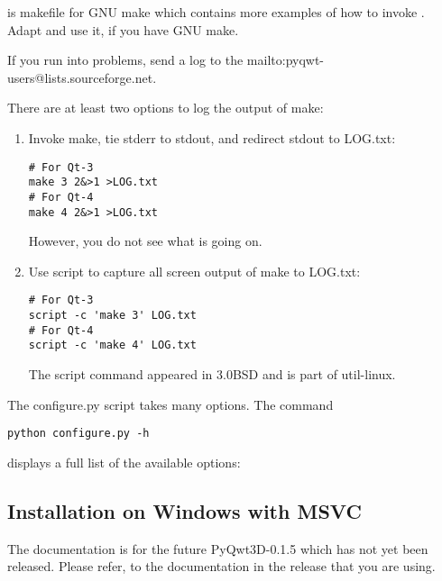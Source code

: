 \documentclass{manual}
\makeatletter
\newcommand{\mailinglist}{\ulink{mailing list}
  {mailto:pyqwt-users@lists.sourceforge.net}}
\newcommand{\Future}{
  \begin{notice}[warning]
    The documentation is for the future PyQwt3D-0.1.5 which has not yet been
    released.  Please refer, to the documentation in the release that you are
    using.
  \end{notice}
}
\makeatother
\begin{document}
\begin{notice}[note]
   is makefile for GNU make which contains more
  examples of how to invoke .
  Adapt and use it, if you have GNU make.
\end{notice}

\begin{notice}[note]
  If you run into problems, send a log to the \mailinglist{}.

  There are at least two options to log the output of make:
  \begin{enumerate}
  \item Invoke make, tie stderr to stdout, and redirect stdout to LOG.txt:
\begin{verbatim}
# For Qt-3
make 3 2&>1 >LOG.txt
# For Qt-4
make 4 2&>1 >LOG.txt
\end{verbatim}
    However, you do not see what is going on.
  \item Use script to capture all screen output of make to LOG.txt:
\begin{verbatim}
# For Qt-3
script -c 'make 3' LOG.txt
# For Qt-4
script -c 'make 4' LOG.txt
\end{verbatim}
    The script command appeared in 3.0BSD and is part of util-linux.
  \end{enumerate}
\end{notice}

\begin{notice}[note]
  The configure.py script takes many options. The command
\begin{verbatim}
python configure.py -h
\end{verbatim}
  displays a full list of the available options:
  
\end{notice}


\subsection{Installation on Windows with MSVC\label{win-install}}

\Future{}
\end{document}

